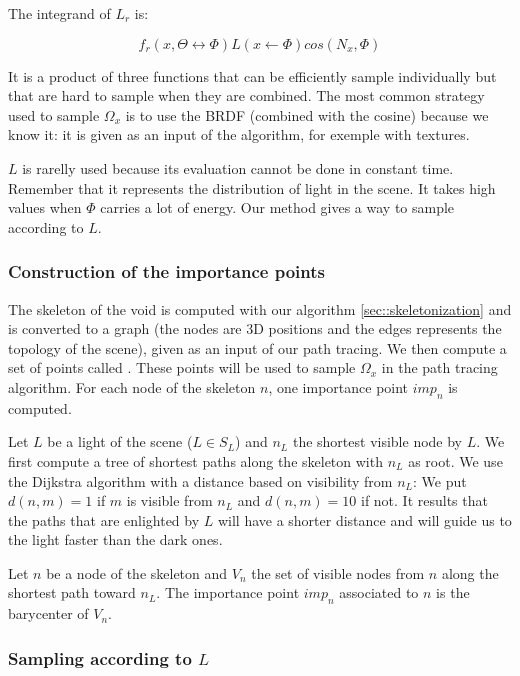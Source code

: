 The integrand of $L_r$ is:

\begin{equation*}
f_r(x, \Theta \leftrightarrow \Phi) L(x \leftarrow \Phi) cos(N_x, \Phi)
\end{equation*}

It is a product of three functions that can be efficiently sample individually but that are hard to sample when they are combined. The most common strategy used to sample $\Omega_x$ is to use the BRDF (combined with the cosine) because we know it: it is given as an input of the algorithm, for exemple with textures.

$L$ is rarelly used because its evaluation cannot be done in constant time. Remember that it represents the distribution of light in the scene. It takes high values when $\Phi$ carries a lot of energy. Our method gives a way to sample according to $L$.

\subsubsection{Construction of the importance points}

The skeleton of the void is computed with our algorithm \ref{sec::skeletonization} and is converted to a graph (the nodes are 3D positions and the edges represents the topology of the scene), given as an input of our path tracing. We then compute a set of points called . These points will be used to sample $\Omega_x$ in the path tracing algorithm. For each node of the skeleton $n$, one importance point $imp_n$ is computed.

Let $L$ be a light of the scene ($L \in S_L$) and $n_L$ the shortest visible node by $L$. We first compute a tree of shortest paths along the skeleton with $n_L$ as root. We use the Dijkstra algorithm with a distance based on visibility from $n_L$: We put $d(n, m) = 1$ if $m$ is visible from $n_L$ and $d(n, m) = 10$ if not. It results that the paths that are enlighted by $L$ will have a shorter distance and will guide us to the light faster than the dark ones.

Let $n$ be a node of the skeleton and $V_n$ the set of visible nodes from $n$ along the shortest path toward $n_L$. The importance point $imp_n$ associated to $n$ is the barycenter of $V_n$.

\subsubsection{Sampling according to $L$}


